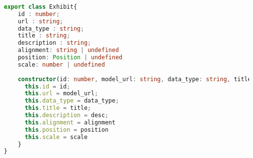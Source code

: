\begin{lstlisting}[caption={Das Datenmodell eines Ausstelungsstückes},  language=TypeScript,label=lst:impl:httpclientrequests]   
  
export class Exhibit{
    id : number;
    url : string;
    data_type : string;
    title : string;
    description : string;
    alignment: string | undefined
    position: Position | undefined
    scale: number | undefined
  
    constructor(id: number, model_url: string, data_type: string, title: string, desc: string, alignment: string | undefined, position: Position | undefined, scale: number | undefined) {
      this.id = id;
      this.url = model_url;
      this.data_type = data_type;
      this.title = title;
      this.description = desc;
      this.alignment = alignment
      this.position = position
      this.scale = scale
    }
}
\end{lstlisting}

